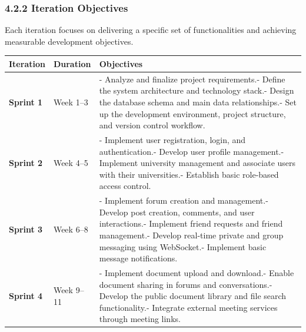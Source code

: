 \documentclass[12pt]{article}
\renewcommand{\baselinestretch}{1.5}
\begin{document}
\subsubsection*{4.2.2 Iteration Objectives}
\par\medskip
Each iteration focuses on delivering a specific set of functionalities and achieving measurable development objectives.
\par\medskip
\begingroup
\scriptsize
\renewcommand{\baselinestretch}{1.0}\selectfont
\renewcommand{\arraystretch}{1.15}
\setlength{\tabcolsep}{4pt}
\begin{longtable}{|>{\raggedright\arraybackslash}p{}|>{\raggedright\arraybackslash}p{}|>{\raggedright\arraybackslash}p{}|}
\hline
Iteration & Duration & Objectives \\ \hline
\endhead
\textbf{Sprint 1} & Week 1–3 & - Analyze and finalize project requirements.\newline{}- Define the system architecture and technology stack.\newline{}- Design the database schema and main data relationships.\newline{}- Set up the development environment, project structure, and version control workflow. \\ \hline
\textbf{Sprint 2} & Week 4–5 & - Implement user registration, login, and authentication.\newline{}- Develop user profile management.\newline{}- Implement university management and associate users with their universities.\newline{}- Establish basic role-based access control. \\ \hline
\textbf{Sprint 3} & Week 6–8 & - Implement forum creation and management.\newline{}- Develop post creation, comments, and user interactions.\newline{}- Implement friend requests and friend management.\newline{}- Develop real-time private and group messaging using WebSocket.\newline{}- Implement basic message notifications. \\ \hline
\textbf{Sprint 4} & Week 9–11 & - Implement document upload and download.\newline{}- Enable document sharing in forums and conversations.\newline{}- Develop the public document library and file search functionality.\newline{}- Integrate external meeting services through meeting links. \\ \hline

\end{longtable}
\end{document}
